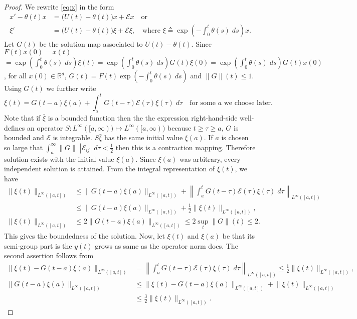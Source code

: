 \documentclass[a4paper,11pt]{article}
\theoremstyle{remark}
\begin{document}
\begin{proof}
We rewrite \eqref{eq:x} in the form
 \begin{align*}
  x' - \theta(t)x &= \big(U(t)-\theta(t)\big)x + \mathcal{E}x \quad \text{or}\\
  \xi' &=\big(U(t)-\theta(t)\big)\xi + \mathcal{E}\xi, \quad \text{where $\xi\triangleq \exp\left(-\int_0^t \theta(s)\; ds\right) x$}.
 \end{align*}
 Let $G(t)$ be the solution map associated to $U(t)-\theta(t)$. Since $F(t)x(0)=x(t)$ \\$= \exp\left(\int_0^t \theta(s)\; ds\right)\xi(t)= \exp\left(\int_0^t \theta(s)\; ds\right)G(t)\xi(0)=\exp\left(\int_0^t \theta(s)\; ds\right)G(t)x(0)$, for all $x(0)\in \mathbb{R}^d$, $G(t) = F(t)\exp\left(-\int_0^t \theta(s)\; ds\right)$ and $\|G\|(t)\le 1$. Using $G(t)$ we further write
 $$ \xi(t) = G(t-a)\xi(a) + \int_a^t G(t-\tau)\mathcal{E}(\tau)\xi(\tau) \; d\tau \quad \text{for some $a$ we choose later.}$$
 Note that if $\bar\xi$ is a bounded function then the the expression right-hand-side well-defines an operator $S:L^\infty([a,\infty)) \mapsto L^\infty([a,\infty))$ because $t\ge \tau\ge a$, $G$ is bounded and $\mathcal{E}$ is integrable. $S\bar\xi$ has the same initial value $\xi(a)$. If $a$ is chosen so large that $\int_a^\infty \|G\| \; |\mathcal{E}_{ij}|\; d\tau < \frac{1}{2}$ then this is a contraction mapping. Therefore solution exists with the initial value $\xi(a)$. Since $\xi(a)$ was arbitrary, every independent solution is attained.
 From the integral representation of $\xi(t)$, we have
 \begin{align*}
 \|\xi(t)\|_{L^\infty([a,t])} &\le \|G(t-a)\xi(a)\|_{L^\infty([a,t])} + \left\|\int_a^t G(t-\tau)\mathcal{E}(\tau)\xi(\tau) \; d\tau\right\|_{L^\infty([a,t])} \\
 &\le \|G(t-a)\xi(a)\|_{L^\infty([a,t])} + \frac{1}{2} \|\xi(t)\|_{L^\infty([a,t])},\\
 \|\xi(t)\|_{L^\infty([a,t])} &\le 2 \|G(t-a)\xi(a)\|_{L^\infty([a,t])} \le 2\sup_t \|G\|(t) \le 2.
 \end{align*}
 This gives the boundedness of the solution. Now, let $\xi(t)$ and $\xi(a)$ be that its semi-group part is the $y(t)$ grows as same as the operator norm does. The second assertion follows from
 \begin{align*}
\big\|\xi(t) - G(t-a)\xi(a)\big\|_{L^\infty([a,t])} &= \left\|\int_a^t G(t-\tau)\mathcal{E}(\tau)\xi(\tau) \; d\tau\right\|_{L^\infty([a,t])} \le \frac{1}{2} \|\xi(t)\|_{L^\infty([a,t])},
\\
\big\|G(t-a)\xi(a)\big\|_{L^\infty([a,t])} &\le \big\|\xi(t) - G(t-a)\xi(a)\big\|_{L^\infty([a,t])} + \big\|\xi(t)\big\|_{L^\infty([a,t])} 
\\
&\le \frac{3}{2} \|\xi(t)\|_{L^\infty([a,t])}.
 \end{align*}
\end{proof}
\end{document}
